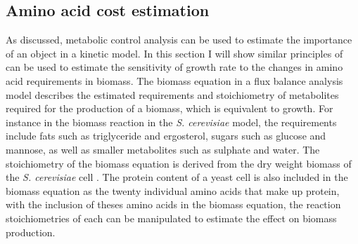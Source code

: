 \subsection{Amino acid cost estimation}\label{section:amino_acid_cost_estimation}

As discussed, metabolic control analysis can be used to estimate the importance of an object in a kinetic model. In this section I will show similar principles of can be used to estimate the sensitivity of growth rate to the changes in amino acid requirements in biomass. The biomass equation in a flux balance analysis model describes the estimated requirements and stoichiometry of metabolites required for the production of a biomass, which is equivalent to growth. For instance in the biomass reaction in the \emph{S. cerevisiae} model, the requirements include fats such as triglyceride and ergosterol, sugars such as glucose and mannose, as well as smaller metabolites such as sulphate and water. The stoichiometry of the biomass equation is derived from the dry weight biomass of the \emph{S. cerevisiae} cell \cite{duarte2004a}. The protein content of a yeast cell is also included in the biomass equation as the twenty individual amino acids that make up protein, with the inclusion of theses amino acids in the biomass equation, the reaction stoichiometries of each can be manipulated to estimate the effect on biomass production.

